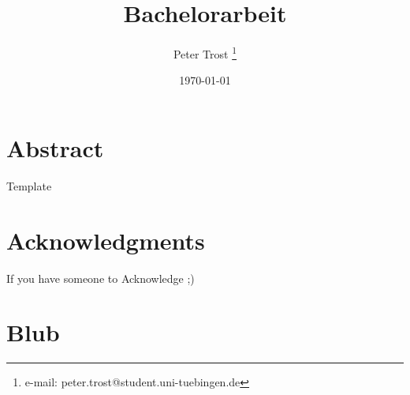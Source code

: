 \documentclass[a4paper,cleardoubleempty,BCOR1cm]{scrbook}
\title{Bachelorarbeit}
\author{Peter Trost \thanks{e-mail: peter.trost@student.uni-tuebingen.de}}
\date{\today}
\begin{document}


\chapter*{Abstract}
Template

\chapter*{Acknowledgments}
If you have someone to Acknowledge ;)

\tableofcontents










\appendix
\chapter{Blub}



\end{document}

